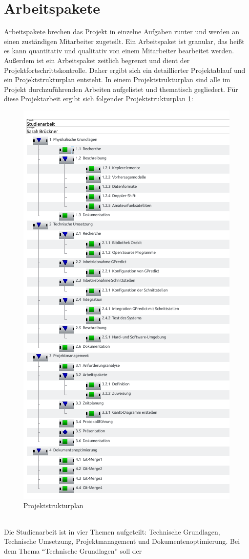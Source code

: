 \section{Arbeitspakete}
Arbeitspakete brechen das Projekt in einzelne Aufgaben runter und werden an einen 
zuständigen Mitarbeiter zugeteilt. Ein Arbeitspaket ist granular, das heißt es kann quantitativ und 
qualitativ von einem Mitarbeiter bearbeitet werden. Außerdem ist ein Arbeitspaket zeitlich begrenzt 
und dient der Projektfortschrittskontrolle. 
Daher ergibt sich ein detaillierter Projektablauf und ein Projektstrukturplan entsteht. In einem 
Projektstrukturplan sind alle im Projekt durchzuführenden Arbeiten aufgelistet und thematisch 
gegliedert. Für diese Projektarbeit ergibt sich folgender Projektstrukturplan 
\ref{fig:projektstruktur}:\\
\begin{figure}[h]
 \centering
\includegraphics[width=0.6\linewidth]{./images/00tasks}
\caption{Projektstrukturplan}
 \label{fig:projektstruktur}
\end{figure}
\\
Die Studienarbeit ist in vier Themen aufgeteilt: Technische Grundlagen, Technische Umsetzung, 
Projektmanagement und Dokumentenoptimierung. Bei dem Thema ``Technische Grundlagen'' soll der 
